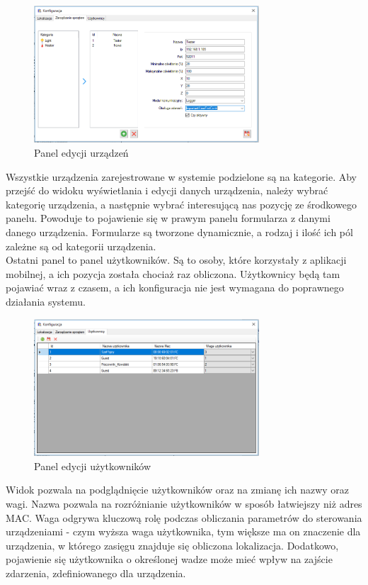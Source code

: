 	\begin{figure}[H]			
		\centering
		\caption{Panel edycji urządzeń}
		\includegraphics[width=0.75\textwidth]{panel_konf_ster}
	\end{figure}
	Wszystkie urządzenia zarejestrowane w systemie podzielone są na kategorie.	Aby przejść do widoku wyświetlania i edycji danych urządzenia, należy wybrać kategorię urządzenia, a następnie wybrać interesującą nas pozycję ze środkowego panelu. Powoduje to pojawienie się w prawym panelu formularza z danymi danego urządzenia. Formularze są tworzone dynamicznie, a rodzaj i ilość ich pól zależne są od kategorii urządzenia.\\	
	Ostatni panel to panel użytkowników. Są to osoby, które korzystały z aplikacji mobilnej, a ich pozycja została chociaż raz obliczona. Użytkownicy będą tam pojawiać wraz z czasem, a ich konfiguracja nie jest wymagana do poprawnego działania systemu.
	\begin{figure}[H]			
		\centering
		\caption{Panel edycji użytkowników}
		\includegraphics[width=0.75\textwidth]{panel_konf_users}
	\end{figure}
	Widok pozwala na podglądnięcie użytkowników oraz na zmianę ich nazwy oraz wagi. Nazwa pozwala na rozróżnianie użytkowników w sposób łatwiejszy niż adres MAC. Waga odgrywa kluczową rolę podczas obliczania parametrów do sterowania urządzeniami - czym wyższa waga użytkownika, tym większe ma on znaczenie dla urządzenia, w którego zasięgu znajduje się obliczona lokalizacja. Dodatkowo, pojawienie się użytkownika o określonej wadze może mieć wpływ na zajście zdarzenia, zdefiniowanego dla urządzenia.\\
		
